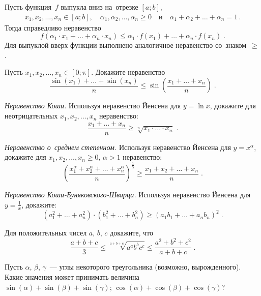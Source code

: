 \begin{problems}

\item{}
Пусть функция~$f$ выпукла вниз на~отрезке $[a;b]$,
\begin{gather*}
    x_1, x_2, \ldots, x_n \in [a; b]
,\quad
    \alpha_1, \alpha_2, \ldots, \alpha_n \geq 0
\quad\text{и}\quad
    \alpha_1 + \alpha_2 + \ldots + \alpha_n = 1
\, . \end{gather*}
Тогда справедливо неравенство
\[
    f(\alpha_1 \cdot x_1 + \ldots + \alpha_n \cdot x_n)
\leq
    \alpha_1 \cdot f(x_1) + \ldots + \alpha_n \cdot f(x_n)
\; . \]
Для выпуклой вверх функции выполнено аналогичное неравенство со~знаком~$\geq$.

\item
Пусть $x_1, x_2, \ldots, x_n \in [0; \mathrm{\pi}]$.
Докажите неравенство
\[
    \frac{\sin(x_1) + \ldots + \sin(x_n)}{n}
\leq
    \sin\left(
        \frac{x_1 + \ldots + x_n}{n}
    \right)
\; . \]

\item\emph{Неравенство Коши.}
Используя неравенство Йенсена для $y = \ln x$, докажите для неотрицательных
$x_1, x_2, \ldots, x_n$ неравенство:
\[
    \frac{x_1 + \ldots + x_n}{n}
\geq
    \sqrt[n]{x_1 \cdot \ldots \cdot x_n}
\; . \]

\item\emph{Неравенство о~среднем степенном.}
Используя неравенство Йенсена для $y = x^{\alpha}$, докажите для
$x_1, x_2, \ldots, x_n \geq 0$, $\alpha > 1$ неравенство:
\[
    \left(
        \frac{
            x_1^{\alpha} + x_2^{\alpha} + \ldots + x_n^{\alpha}
        }{n}
    \right)^{\frac{1}{\alpha}}
\geq
    \frac{x_1 + x_2 + \ldots + x_n}{n}
\; . \]

\item\emph{Неравенство Коши-Буняковского-Шварца.}
Используя неравенство Йенсена для $y = \frac{1}{x}$, докажите:
\[
    (a_1^2 + \ldots + a_n^2) \cdot (b_1^2 + \ldots + b_n^2)
\geq
    (a_1 b_1 + \ldots + a_n b_n)^2
\; . \]

\item
Для положительных чисел $a$, $b$, $c$ докажите, что
\[
    \frac{a + b + c}{3}
\leq
    \sqrt[a+b+c]{a^a b^b c^c}
\leq
    \frac{a^2 + b^2 + c^2}{a + b + c}
\; . \]

\item
Пусть $\alpha$, $\beta$, $\gamma$~— углы некоторого треугольника
(возможно, вырожденного).
Какие значения может принимать величина
\\
\subproblem $\sin(\alpha) + \sin(\beta) + \sin(\gamma)$;
\quad
\subproblem $\cos(\alpha) + \cos(\beta) + \cos(\gamma)$?


\end{problems}

